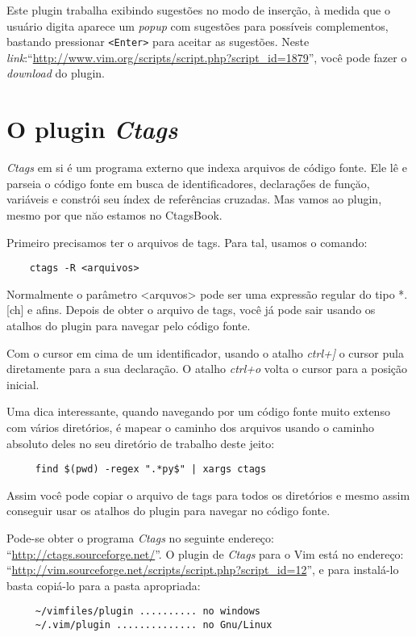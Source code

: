 Este plugin trabalha exibindo sugestões no modo de inserção, à
medida que o usuário digita aparece um {\em popup} com sugestões para possíveis
complementos, bastando pressionar {\tt <Enter>} para aceitar as sugestões.
Neste {\em link}:``\url{http://www.vim.org/scripts/script.php?script_id=1879}'', você pode
fazer o {\em download} do plugin.

\section{O plugin {\em Ctags}}
\label{sec:O Plugin Ctags}

{\em Ctags} em si é um programa externo que indexa arquivos de código fonte. Ele lê e parseia
o código fonte em busca de identificadores, declaraçőes de funçăo, variáveis e constrói seu 
índex de referências cruzadas. Mas vamos ao plugin, mesmo por que năo estamos no CtagsBook.

Primeiro precisamos ter o arquivos de tags. Para tal, usamos o comando:

\begin{verbatim}
    ctags -R <arquivos>
\end{verbatim}

Normalmente o parâmetro <arquvos> pode ser uma expressão regular do tipo *.[ch] e afins. Depois
de obter o arquivo de tags, você já pode sair usando os atalhos do plugin para navegar pelo 
código fonte. 

Com o cursor em cima de um identificador, usando o atalho {\em ctrl+]} o cursor pula diretamente 
para a sua declaração. O atalho {\em ctrl+o} volta o cursor para a posição inicial.

Uma dica interessante, quando navegando por um código fonte muito extenso com vários diretórios, 
é mapear o caminho dos arquivos usando o caminho absoluto deles no seu diretório de trabalho 
deste jeito:

\begin{verbatim}
     find $(pwd) -regex ".*py$" | xargs ctags
\end{verbatim}

Assim você pode copiar o arquivo de tags para todos os diretórios e mesmo assim conseguir usar 
os atalhos do plugin para navegar no código fonte.

Pode-se obter o programa {\em Ctags} no seguinte endereço: 
``\url{http://ctags.sourceforge.net/}''. O plugin de {\em Ctags} para o Vim está no endereço: 
``\url{http://vim.sourceforge.net/scripts/script.php?script_id=12}'', 
e para instalá-lo basta copiá-lo para a pasta apropriada:
    
\begin{verbatim}
     ~/vimfiles/plugin .......... no windows
     ~/.vim/plugin .............. no Gnu/Linux
\end{verbatim}
